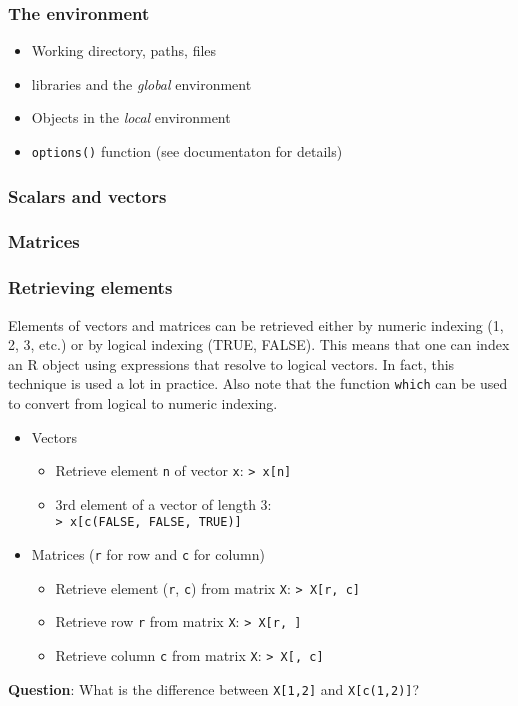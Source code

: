 \documentclass{beamer}
\begin{document}
\begin{frame}[fragile]
    \frametitle{The environment}
    \begin{itemize}
      \item Working directory, paths, files
      \item libraries and the \emph{global} environment
      \item Objects in the \emph{local} environment
      \item \texttt{options()} function (see documentaton for details)
    \end{itemize}
    
\end{frame}


\begin{frame}[fragile]
    \frametitle{Scalars and vectors}
    
\end{frame}


\begin{frame}[fragile]
    \frametitle{Matrices}
    
\end{frame}


\begin{frame}
    \frametitle{Retrieving elements}
    Elements of vectors and matrices can be retrieved either by numeric indexing (1, 2, 3, etc.)
    or by logical indexing (TRUE, FALSE).
    This means that one can index an R object using expressions that resolve to logical vectors.
    In fact, this technique is used a lot in practice.
    Also note that the function \texttt{which} can be used to convert from logical to numeric indexing.
    \begin{itemize}
      \item Vectors
        \begin{itemize}
          \item Retrieve element \texttt{n} of vector \texttt{x}: \texttt{> x[n]}
          \item 3rd element of a vector of length 3:\\ \texttt{> x[c(FALSE, FALSE, TRUE)]}
        \end{itemize}
      \item Matrices (\texttt{r} for row and \texttt{c} for column)
        \begin{itemize}
          \item Retrieve element (\texttt{r}, \texttt{c}) from matrix \texttt{X}: \texttt{> X[r, c]}
          \item Retrieve row \texttt{r} from matrix \texttt{X}: \texttt{> X[r, ]}
          \item Retrieve column \texttt{c} from matrix \texttt{X}: \texttt{> X[, c]}
        \end{itemize}
    \end{itemize}
    \textbf{Question}: What is the difference between \texttt{X[1,2]} and \texttt{X[c(1,2)]}?
\end{frame}
\end{document}

